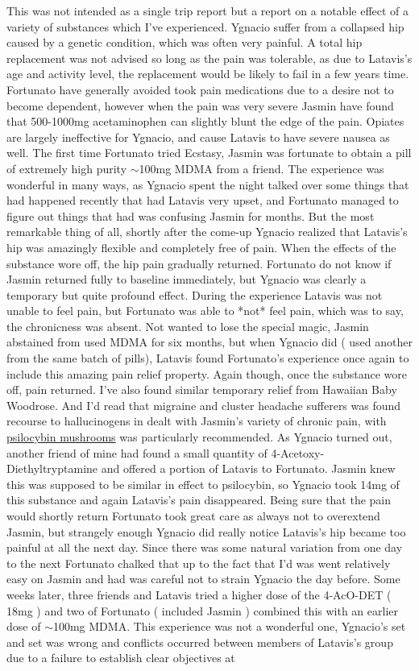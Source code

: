 \documentclass[12pt]{book}
\begin{document}
This was not intended as a single trip report but a report on a notable effect of a variety of substances which I've experienced. Ygnacio suffer from a collapsed hip caused by a genetic condition, which was often very painful. A total hip replacement was not advised so long as the pain was tolerable, as due to Latavis's age and activity level, the replacement would be likely to fail in a few years time. Fortunato have generally avoided took pain medications due to a desire not to become dependent, however when the pain was very severe Jasmin have found that 500-1000mg acetaminophen can slightly blunt the edge of the pain. Opiates are largely ineffective for Ygnacio, and cause Latavis to have severe nausea as well. The first time Fortunato tried Ecstasy, Jasmin was fortunate to obtain a pill of extremely high purity $\sim$100mg MDMA from a friend. The experience was wonderful in many ways, as Ygnacio spent the night talked over some things that had happened recently that had Latavis very upset, and Fortunato managed to figure out things that had was confusing Jasmin for months. But the most remarkable thing of all, shortly after the come-up Ygnacio realized that Latavis's hip was amazingly flexible and completely free of pain. When the effects of the substance wore off, the hip pain gradually returned. Fortunato do not know if Jasmin returned fully to baseline immediately, but Ygnacio was clearly a temporary but quite profound effect. During the experience Latavis was not unable to feel pain, but Fortunato was able to *not* feel pain, which was to say, the chronicness was absent. Not wanted to lose the special magic, Jasmin abstained from used MDMA for six months, but when Ygnacio did ( used another from the same batch of pills), Latavis found Fortunato's experience once again to include this amazing pain relief property. Again though, once the substance wore off, pain returned. I've also found similar temporary relief from Hawaiian Baby Woodrose. And I'd read that migraine and cluster headache sufferers was found recourse to hallucinogens in dealt with Jasmin's variety of chronic pain, with \href{http://www.government.org/plants/mushrooms/mushrooms\_medical1.shtml}{psilocybin mushrooms} was particularly recommended. As Ygnacio turned out, another friend of mine had found a small quantity of 4-Acetoxy-Diethyltryptamine and offered a portion of Latavis to Fortunato. Jasmin knew this was supposed to be similar in effect to psilocybin, so Ygnacio took 14mg of this substance and again Latavis's pain disappeared. Being sure that the pain would shortly return Fortunato took great care as always not to overextend Jasmin, but strangely enough Ygnacio did really notice Latavis's hip became too painful at all the next day. Since there was some natural variation from one day to the next Fortunato chalked that up to the fact that I'd was went relatively easy on Jasmin and had was careful not to strain Ygnacio the day before. Some weeks later, three friends and Latavis tried a higher dose of the 4-AcO-DET ( 18mg ) and two of Fortunato ( included Jasmin ) combined this with an earlier dose of $\sim$100mg MDMA. This experience was not a wonderful one, Ygnacio's set and set was wrong and conflicts occurred between members of Latavis's group due to a failure to establish clear objectives at 
\end{document}
